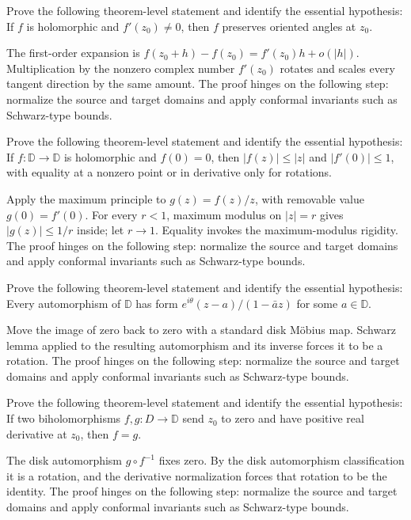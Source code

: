 \begin{problem}\label{prob:iv17-problem-08}
Prove the following theorem-level statement and identify the essential hypothesis: If $f$ is holomorphic and $f'(z_0)\ne0$, then $f$ preserves oriented angles at $z_0$.
\end{problem}
\begin{solution}
The first-order expansion is $f(z_0+h)-f(z_0)=f'(z_0)h+o(|h|)$. Multiplication by the nonzero complex number $f'(z_0)$ rotates and scales every tangent direction by the same amount. The proof hinges on the following step: normalize the source and target domains and apply conformal invariants such as Schwarz-type bounds.
\end{solution}

\begin{problem}\label{prob:iv17-problem-09}
Prove the following theorem-level statement and identify the essential hypothesis: If $f:\mathbb D\to\mathbb D$ is holomorphic and $f(0)=0$, then $|f(z)|\le|z|$ and $|f'(0)|\le1$, with equality at a nonzero point or in derivative only for rotations.
\end{problem}
\begin{solution}
Apply the maximum principle to $g(z)=f(z)/z$, with removable value $g(0)=f'(0)$. For every $r<1$, maximum modulus on $|z|=r$ gives $|g(z)|\le1/r$ inside; let $r\to1$. Equality invokes the maximum-modulus rigidity. The proof hinges on the following step: normalize the source and target domains and apply conformal invariants such as Schwarz-type bounds.
\end{solution}

\begin{problem}\label{prob:iv17-problem-10}
Prove the following theorem-level statement and identify the essential hypothesis: Every automorphism of $\mathbb D$ has form $e^{i\theta}(z-a)/(1-\bar a z)$ for some $a\in\mathbb D$.
\end{problem}
\begin{solution}
Move the image of zero back to zero with a standard disk Möbius map. Schwarz lemma applied to the resulting automorphism and its inverse forces it to be a rotation. The proof hinges on the following step: normalize the source and target domains and apply conformal invariants such as Schwarz-type bounds.
\end{solution}

\begin{problem}\label{prob:iv17-problem-11}
Prove the following theorem-level statement and identify the essential hypothesis: If two biholomorphisms $f,g:D\to\mathbb D$ send $z_0$ to zero and have positive real derivative at $z_0$, then $f=g$.
\end{problem}
\begin{solution}
The disk automorphism $g\circ f^{-1}$ fixes zero. By the disk automorphism classification it is a rotation, and the derivative normalization forces that rotation to be the identity. The proof hinges on the following step: normalize the source and target domains and apply conformal invariants such as Schwarz-type bounds.
\end{solution}

